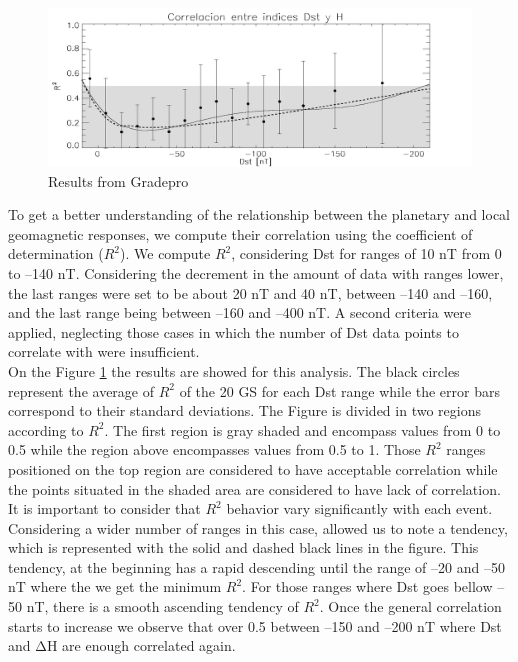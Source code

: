 \documentclass[a4paper, 11pt]{article}
\begin{document}
\begin{figure}
\centering
\includegraphics[width=1.0\textwidth]{correlation_plotV4.png}
\caption{\label{correlation}Results from Gradepro}
\end{figure}

To get a better understanding of the relationship between the planetary and local geomagnetic responses, we compute their correlation using the coefficient of determination ($R^2$). We compute $R^2$, considering Dst for ranges of 10 nT from 0 to –140 nT. Considering the decrement in the amount of data with ranges lower, the last ranges were set to be about 20 nT and 40 nT, between –140 and –160, and the last range being between –160 and –400 nT. A second criteria were applied, neglecting those cases in which the number of Dst data points to correlate with were insufficient.\\   

On the Figure \ref{correlation} the results are showed for this analysis. The black circles represent the average of $R^2$ of the 20 GS for each Dst range while the error bars correspond to their standard deviations. The Figure is divided in two regions according to $R^2$. The first region is gray shaded and encompass values from 0 to 0.5 while the region above encompasses values from 0.5 to 1. Those $R^2$ ranges positioned on the top region are considered to have acceptable correlation while the points situated in the shaded area are considered to have lack of correlation. It is important to consider that $R^2$ behavior vary significantly with each event.\\  

Considering a wider number of ranges in this case, allowed us to note a tendency, which is represented with the solid and dashed black lines in the figure. This tendency, at the beginning has a rapid descending until the range of –20 and –50 nT where the we get the minimum $R^2$. For those ranges where Dst goes bellow –50 nT, there is a smooth ascending tendency of $R^2$. Once the general correlation starts to increase we observe that over 0.5 between –150 and –200 nT where Dst and $\mathrm{\Delta H}$ are enough correlated again.\\  
\end{document}
